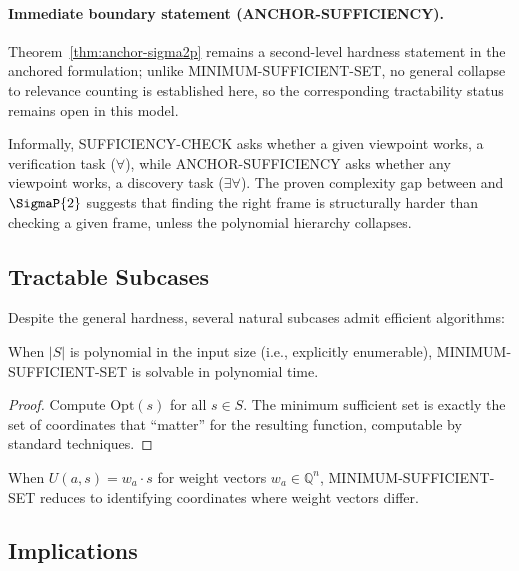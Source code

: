 \paragraph{Immediate boundary statement (ANCHOR-SUFFICIENCY).}
Theorem~\ref{thm:anchor-sigma2p} remains a second-level hardness statement in the anchored formulation; unlike MINIMUM-SUFFICIENT-SET, no general collapse to relevance counting is established here, so the corresponding tractability status remains open in this model.

\begin{remark}
Informally, SUFFICIENCY-CHECK asks whether a given viewpoint works, a verification task (\(\forall\)), while ANCHOR-SUFFICIENCY asks whether any viewpoint works, a discovery task (\(\exists\forall\)). The proven complexity gap between \coNP{} and \(\SigmaP{2}\) suggests that finding the right frame is structurally harder than checking a given frame, unless the polynomial hierarchy collapses.
\end{remark}

\subsection{Tractable Subcases}

Despite the general hardness, several natural subcases admit efficient algorithms:

\begin{proposition}
When $|S|$ is polynomial in the input size (i.e., explicitly enumerable), MINIMUM-SUFFICIENT-SET is solvable in polynomial time.
\end{proposition}

\begin{proof}
Compute $\text{Opt}(s)$ for all $s \in S$. The minimum sufficient set is exactly the set of coordinates that ``matter'' for the resulting function, computable by standard techniques.
\end{proof}

\begin{proposition}
When $U(a, s) = w_a \cdot s$ for weight vectors $w_a \in \mathbb{Q}^n$, MINIMUM-SUFFICIENT-SET reduces to identifying coordinates where weight vectors differ.
\end{proposition}

\subsection{Implications}


